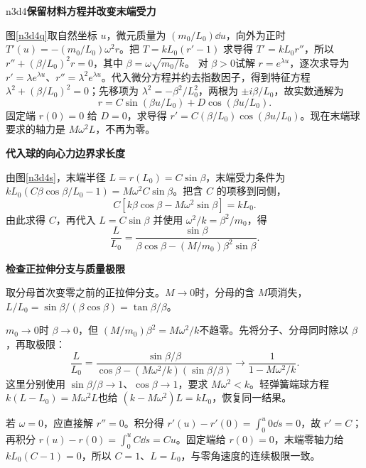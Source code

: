 \begin{drillsolution}{n3d4}\textbf{保留材料方程并改变末端受力}\par\nobreak
图\ref{n3d4q}取自然坐标 $u$，微元质量为 $(m_0/L_0)\dd u$，向外为正时
$T'(u)=-(m_0/L_0)\omega^2r$。把 $T=kL_0(r'-1)$ 求导得 $T'=kL_0r''$，所以
$r''+(\beta/L_0)^2r=0$，其中 $\beta=\omega\sqrt{m_0/k}$。
对 $\beta>0$试解 $r=e^{\lambda u}$，逐次求导为 $r'=\lambda e^{\lambda u}$、$r''=\lambda^2e^{\lambda u}$。代入微分方程并约去指数因子，得到特征方程
$\lambda^2+(\beta/L_0)^2=0$；先移项为 $\lambda^2=-\beta^2/L_0^2$，两根为 $\pm i\beta/L_0$，故实数通解为
\[
r=C\sin(\beta u/L_0)+D\cos(\beta u/L_0).
\]
固定端 $r(0)=0$ 给 $D=0$，求导得 $r'=C(\beta/L_0)\cos(\beta u/L_0)$。现在末端球要求的轴力是 $M\omega^2L$，不再为零。


\par\medskip{}\noindent\textbf{代入球的向心力边界求长度}\par\nobreak
由图\ref{n3d4s}，末端半径 $L=r(L_0)=C\sin\beta$，末端受力条件为
$kL_0(C\beta\cos\beta/L_0-1)=M\omega^2C\sin\beta$。把含 $C$ 的项移到同侧，
\[
C\left[k\beta\cos\beta-M\omega^2\sin\beta\right]=kL_0.
\]
由此求得 $C$，再代入 $L=C\sin\beta$ 并使用 $\omega^2/k=\beta^2/m_0$，得
\[\frac L{L_0}=\frac{\sin\beta}{\beta\cos\beta-(M/m_0)\beta^2\sin\beta}.\]


\par\medskip{}\noindent\textbf{检查正拉伸分支与质量极限}\par\nobreak
取分母首次变零之前的正拉伸分支。$M\to0$时，分母的含 $M$项消失，$L/L_0=\sin\beta/(\beta\cos\beta)=\tan\beta/\beta$。

$m_0\to0$时 $\beta\to0$，但 $(M/m_0)\beta^2=M\omega^2/k$不趋零。先将分子、分母同时除以 $\beta$，再取极限：
\[
 \frac L{L_0}
 =\frac{\sin\beta/\beta}
 {\cos\beta-(M\omega^2/k)(\sin\beta/\beta)}
 \longrightarrow\frac1{1-M\omega^2/k}.
\]
这里分别使用 $\sin\beta/\beta\to1$、$\cos\beta\to1$，要求 $M\omega^2<k$。轻弹簧端球方程 $k(L-L_0)=M\omega^2L$也给 $(k-M\omega^2)L=kL_0$，恢复同一结果。

若 $\omega=0$，应直接解 $r''=0$。积分得 $r'(u)-r'(0)=\int_0^u0\dd s=0$，故 $r'=C$；再积分 $r(u)-r(0)=\int_0^u C\dd s=Cu$。固定端给 $r(0)=0$，末端零轴力给 $kL_0(C-1)=0$，所以 $C=1$、$L=L_0$，与零角速度的连续极限一致。
\end{drillsolution}
